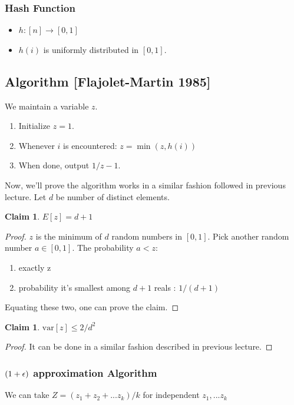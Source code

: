 \documentclass[11pt]{article}
\newtheorem{claim}[theorem]{Claim}
\def\eps{\ensuremath\epsilon}
\begin{document}
\subsubsection{Hash Function}
\begin{itemize}
\item $h : [n] \rightarrow [0,1]$
\item $h(i)$ is uniformly distributed in $[0,1]$.
\end{itemize}

\subsection{Algorithm [Flajolet-Martin 1985]}
We maintain a variable $z$.
\begin{enumerate}
\item Initialize $z = 1$.
\item Whenever $i$ is encountered: $z = \min{(z,h(i))}$
\item When done, output $1/z -1$.
\end{enumerate}

Now, we'll prove the algorithm works in a similar fashion followed in previous lecture.
Let $d$ be number of distinct elements.

\begin{claim}
$E[z] = d+1$
\end{claim}

\begin{proof}
$z$ is the minimum of $d$ random numbers in $[0,1]$. Pick another random number $a \in [0,1]$. The probability $a<z$:
\begin{enumerate}
\item exactly z
\item probability it's smallest among $d+1$ reals : $1/(d+1)$
\end{enumerate}
Equating these two, one can prove the claim.
\end{proof}

\begin{claim}
$\text{var}[z] \leq 2/d^{2}$
\end{claim}

\begin{proof}
It can be done in a similar fashion described in previous lecture.
\end{proof}

\subsubsection{$(1+\eps)$ approximation Algorithm }
We can take $Z = (z_{1} + z_{2} + ... z_{k})/k$ for independent $z_{1}, ... z_{k}$
\end{document}
